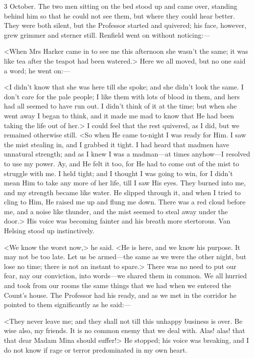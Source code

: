 \begin{diary}{3 October.}
The two men sitting on the bed stood up and came over, standing behind him so that he could not see them, but where they could hear better. They were both silent, but the Professor started and quivered; his face, however, grew grimmer and sterner still. Renfield went on without noticing:—

<When Mrs Harker came in to see me this afternoon she wasn't the same; it was like tea after the teapot had been watered.> Here we all moved, but no one said a word; he went on:—

<I didn't know that she was here till she spoke; and she didn't look the same. I don't care for the pale people; I like them with lots of blood in them, and hers had all seemed to have run out. I didn't think of it at the time; but when she went away I began to think, and it made me mad to know that He had been taking the life out of her.> I could feel that the rest quivered, as I did, but we remained otherwise still. <So when He came to-night I was ready for Him. I saw the mist stealing in, and I grabbed it tight. I had heard that madmen have unnatural strength; and as I knew I was a madman—at times anyhow—I resolved to use my power. Ay, and He felt it too, for He had to come out of the mist to struggle with me. I held tight; and I thought I was going to win, for I didn't mean Him to take any more of her life, till I saw His eyes. They burned into me, and my strength became like water. He slipped through it, and when I tried to cling to Him, He raised me up and flung me down. There was a red cloud before me, and a noise like thunder, and the mist seemed to steal away under the door.> His voice was becoming fainter and his breath more stertorous. Van Helsing stood up instinctively.

<We know the worst now,> he said. <He is here, and we know his purpose. It may not be too late. Let us be armed—the same as we were the other night, but lose no time; there is not an instant to spare.> There was no need to put our fear, nay our conviction, into words—we shared them in common. We all hurried and took from our rooms the same things that we had when we entered the Count's house. The Professor had his ready, and as we met in the corridor he pointed to them significantly as he said:—

<They never leave me; and they shall not till this unhappy business is over. Be wise also, my friends. It is no common enemy that we deal with. Alas! alas! that that dear Madam Mina should suffer!> He stopped; his voice was breaking, and I do not know if rage or terror predominated in my own heart.


\end{diary}
